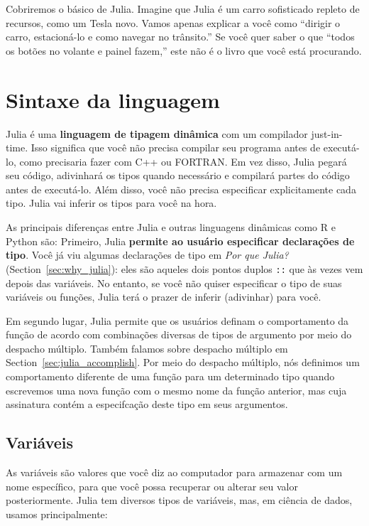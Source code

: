 \documentclass[
  notoc %
]{tufte-book}
\newcommand{\passthrough}[1]{#1}
\begin{document}
Cobriremos o básico de Julia. Imagine que Julia é um carro sofisticado
repleto de recursos, como um Tesla novo. Vamos apenas explicar a você
como ``dirigir o carro, estacioná-lo e como navegar no trânsito.'' Se
você quer saber o que ``todos os botões no volante e painel fazem,''
este não é o livro que você está procurando.

\hypertarget{sec:syntax}{%
\section{Sintaxe da linguagem}\label{sec:syntax}}

Julia é uma \textbf{linguagem de tipagem dinâmica} com um compilador
just-in-time. Isso significa que você não precisa compilar seu programa
antes de executá-lo, como precisaria fazer com C++ ou FORTRAN. Em vez
disso, Julia pegará seu código, adivinhará os tipos quando necessário e
compilará partes do código antes de executá-lo. Além disso, você não
precisa especificar explicitamente cada tipo. Julia vai inferir os tipos
para você na hora.

As principais diferenças entre Julia e outras linguagens dinâmicas como
R e Python são: Primeiro, Julia \textbf{permite ao usuário especificar
declarações de tipo}. Você já viu algumas declarações de tipo em
\emph{Por que Julia?} (Section~\ref{sec:why_julia}): eles são aqueles
dois pontos duplos \passthrough{\lstinline!::!} que às vezes vem depois
das variáveis. No entanto, se você não quiser especificar o tipo de suas
variáveis ou funções, Julia terá o prazer de inferir (adivinhar) para
você.

Em segundo lugar, Julia permite que os usuários definam o comportamento
da função de acordo com combinações diversas de tipos de argumento por
meio do despacho múltiplo. Também falamos sobre despacho múltiplo em
Section~\ref{sec:julia_accomplish}. Por meio do despacho múltiplo, nós
definimos um comportamento diferente de uma função para um determinado
tipo quando escrevemos uma nova função com o mesmo nome da função
anterior, mas cuja assinatura contém a especifcação deste tipo em seus
argumentos.

\hypertarget{sec:variable}{%
\subsection{Variáveis}\label{sec:variable}}

As variáveis são valores que você diz ao computador para armazenar com
um nome específico, para que você possa recuperar ou alterar seu valor
posteriormente. Julia tem diversos tipos de variáveis, mas, em ciência
de dados, usamos principalmente:
\end{document}
